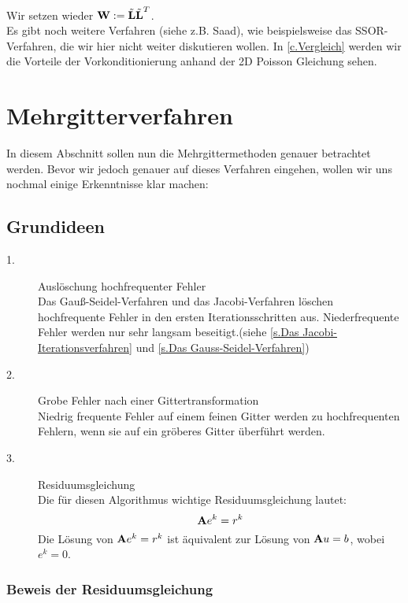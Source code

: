 Wir setzen wieder ${\textbf{W}} := \tilde{{\textbf{L}}} \tilde{{\textbf{L}}}^{T}$. \\
Es gibt noch weitere Verfahren (siehe z.B. Saad), wie beispielsweise das SSOR-Verfahren, die wir hier nicht weiter diskutieren wollen. In \autoref{c.Vergleich} werden wir die Vorteile der Vorkonditionierung anhand der 2D Poisson Gleichung sehen.

\chapter{Mehrgitterverfahren}\label{c.Mehrgitterverfahren}

In diesem Abschnitt sollen nun die Mehrgittermethoden genauer betrachtet werden. Bevor wir jedoch genauer auf dieses Verfahren eingehen, wollen wir uns nochmal einige Erkenntnisse klar machen:

\section{Grundideen}

\begin{description}

\item[1.] Auslöschung hochfrequenter Fehler \\
Das Gauß-Seidel-Verfahren und das Jacobi-Verfahren löschen hochfrequente Fehler in den ersten Iterationsschritten aus. Niederfrequente Fehler werden nur sehr langsam beseitigt.(siehe \autoref{s.Das Jacobi-Iterationsverfahren} und \autoref{s.Das Gauss-Seidel-Verfahren})
\item[2.] Grobe Fehler nach einer Gittertransformation \\
Niedrig frequente Fehler auf einem feinen Gitter werden zu hochfrequenten Fehlern, wenn sie auf ein gröberes Gitter überführt werden.
\item[3.] Residuumsgleichung \\
Die für diesen Algorithmus wichtige Residuumsgleichung lautet:
\begin{equation}
{\textbf{A}} e^{k} = r^{k}\label{eq.Residuumsgleichung}
\end{equation}
Die Lösung von ${\textbf{A}} e^{k} = r^{k}$ ist äquivalent zur Lösung von ${\textbf{A}}u=b$, wobei $e^{k} = 0$.

\end{description}

\subsection{Beweis der Residuumsgleichung}

